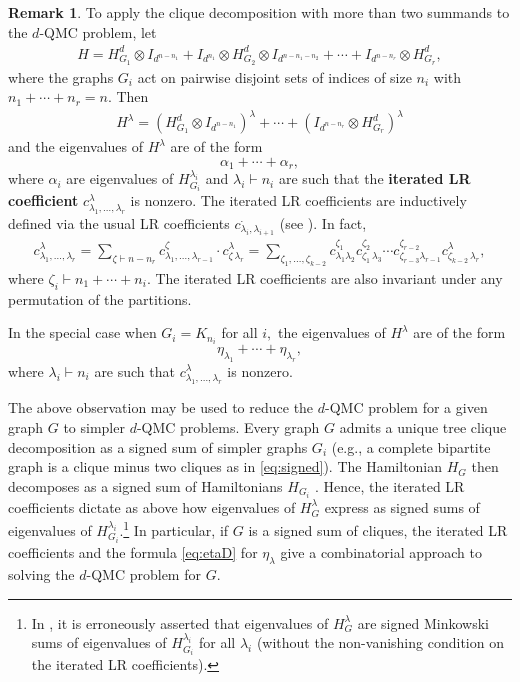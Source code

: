 \documentclass[12pt,dvipsnames,accepted=2016-08-18,a4paper,onecolumn]{quantumarticle}
\def\la{\lambda}
\def\la{\lambda}
\numberwithin{equation}{section}
\theoremstyle{definition}
\newtheorem{remark}[theorem]{Remark}
\begin{document}
\begin{remark}
To apply the clique decomposition  with more than two summands to the $d$-QMC problem, let
  \begin{align*}
        H =  H^d_{G_1} \otimes  I_{d^{n-n_1}} + 
I_{d^{n_1}} \otimes H^d_{G_2} \otimes I_{d^{n-n_1-n_2}} + 
        \cdots + I_{d^{n-n_r}}\otimes H^d_{G_r}  ,
    \end{align*}
    where the graphs $G_i$ act on pairwise disjoint sets of indices of size $n_i$ with $n_1 + \cdots +n_r = n.$
   Then
   \begin{align*}
        H^\la =  (H^d_{G_1} \otimes  I_{d^{n-n_1}})^\la + \cdots +(I_{d^{n-n_r}}\otimes H^d_{G_r} )^\la
    \end{align*}
   and the eigenvalues of $H^\la$ are of the form
   $$
   \alpha_{1} + \cdots + \alpha_{r},
   $$
   where $\alpha_i$ are eigenvalues of $H^{\la_i}_{G_i}$ and 
   $\la_i \vdash n_i$ are such that the \textbf{iterated LR coefficient} $c^\la_{\la_1,\ldots,\la_r}$  is nonzero. The iterated LR coefficients are inductively defined via the usual LR coefficients $c_{\la_i, \la_{i+1}}^\cdot$ (see  \cite{KLMS12,GL20}). In fact,
\begin{align*}
   c^\la_{\la_1,\ldots,\la_r} = \sum_{\zeta \vdash n-n_r} c^\zeta_{\la_1,\ldots,\la_{r-1}} \cdot c^\la_{\zeta\,\la_r} 
   = \sum_{\zeta_1,\ldots,\zeta_{k-2}} c^{\zeta_1}_{\la_1\la_2} c^{\zeta_2}_{\zeta_1 \,\la_3} \cdots  c^{\zeta_{r-2}}_{\zeta_{r-3}\la_{r-1}}c^\la_{\zeta_{k-2}\,\la_r},
\end{align*}
where $\zeta_i \vdash n_1+\cdots +n_i.$
The iterated LR coefficients are also invariant under any permutation of the partitions.

In the special case when $G_i = K_{n_i}$ for all $i,$
 the eigenvalues of $H^\la$ are of the form
   $$
   \eta_{\la_1} + \cdots + \eta_{\la_r},
   $$
   where $\la_i \vdash n_i$ are such that $c^\la_{\la_1,\ldots,\la_r}$  is nonzero.

The above observation may be used to reduce the $d$-QMC problem for a given graph $G$ to simpler $d$-QMC problems. 
Every graph $G$ admits a unique tree clique decomposition \cite[Theorem 6.3]{BCEHK24} as a signed sum of simpler graphs $G_i$ (e.g., a complete bipartite graph is a clique minus two cliques as in \eqref{eq:signed}). The Hamiltonian $H_G$ then decomposes as a signed sum of Hamiltonians $H_{G_i}$ \cite[Theorem 6.5]{BCEHK24}. 
Hence, the iterated LR coefficients dictate as above how eigenvalues of $H_G^\lambda$ express as signed sums of eigenvalues of $H_{G_i}^{\lambda_i}$.\footnote{
In \cite[Section 6.5]{BCEHK24}, it is erroneously asserted that eigenvalues of $H_G^\lambda$ are signed Minkowski sums of eigenvalues of $H_{G_i}^{\lambda_i}$ for all $\lambda_i$ (without the non-vanishing condition on the iterated LR coefficients). 
}
In particular, if $G$ is a signed sum of cliques, the iterated LR coefficients and the formula \eqref{eq:etaD} for $\eta_\lambda$ give a combinatorial approach to solving the $d$-QMC problem for $G$.
\end{remark}
\end{document}
